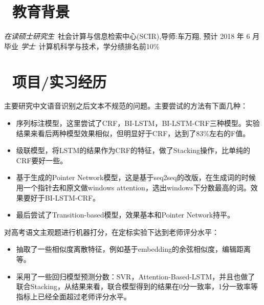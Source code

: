 \documentclass{resume}
\begin{document}


\section{\faGraduationCap\  教育背景}
\textit{在读硕士研究生}\ 社会计算与信息检索中心(SCIR),导师:车万翔, 预计 2018 年 6 月毕业
\textit{学士}\ 计算机科学与技术，学分绩排名前10\%

\section{\faUsers\ 项目/实习经历}
主要研究中文语音识别之后文本不规范的问题。主要尝试的方法有下面几种：
\begin{itemize}
  \item 序列标注模型，这里尝试了CRF，BI-LSTM，BI-LSTM-CRF三种模型。实验结果来看后两种模型效果相似，但明显好于CRF，达到了83\%左右的F值。
  \item 级联模型，将LSTM的结果作为CRF的特征，做了Stacking操作，比单纯的CRF要好一些。
  \item 基于生成的Pointer Network模型，这是基于seq2seq的改版，在生成词的时候用一个指针去和原文做windows attention，选出windows下分数最高的词。效果要好于BI-LSTM-CRF。
  \item 最后尝试了Transition-based模型，效果基本和Pointer Network持平。
\end{itemize}


\begin{onehalfspacing}
对高考语文主观题进行机器打分，在定标实验下达到老师评分水平：
\begin{itemize}
  \item 抽取了一些相似度离散特征，例如基于embedding的余弦相似度，编辑距离等。
  \item 采用了一些回归模型预测分数：SVR，Attention-Based-LSTM，并且也做了联合Stacking，从结果来看，联合模型得到的结果在0分一致率，1分一致率等指标上已经全面超过老师评分水平。
\end{itemize} 
\end{onehalfspacing}
\end{document}
